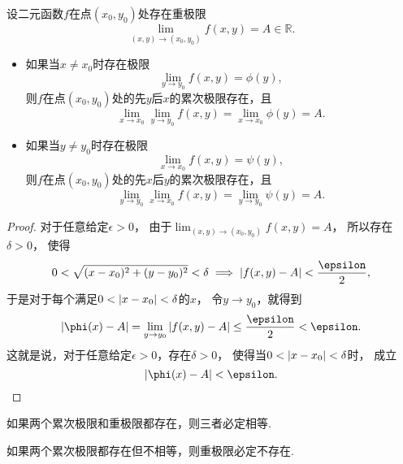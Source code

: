 \begin{theorem}\label{theorem:重极限.二元函数的重极限与累次极限的关系}
设二元函数\(f\)在点\((x_0,y_0)\)处存在重极限\[
	\lim_{(x,y)\to(x_0,y_0)} f(x,y) = A \in \mathbb{R}.
\]\begin{itemize}%
	\item 如果当\(x \neq x_0\)时存在极限\[
		\lim_{y \to y_0} f(x,y) = \phi(y),
	\]
	则\(f\)在点\((x_0,y_0)\)处的先\(y\)后\(x\)的累次极限存在，且\[
		\lim_{x \to x_0} \lim_{y \to y_0} f(x,y)
		= \lim_{x \to x_0} \phi(y) = A.
	\]

	\item 如果当\(y \neq y_0\)时存在极限\[
		\lim_{x \to x_0} f(x,y) = \psi(y),
	\]
	则\(f\)在点\((x_0,y_0)\)处的先\(x\)后\(y\)的累次极限存在，且\[
		\lim_{y \to y_0} \lim_{x \to x_0} f(x,y)
		= \lim_{y \to y_0} \psi(y) = A.
	\]
\end{itemize}
\begin{proof}
对于任意给定\(\epsilon>0\)，
由于\(\lim_{(x,y)\to(x_0,y_0)} f(x,y) = A\)，
所以存在\(\delta>0\)，
使得\[
	0<\sqrt{(x-x_0)^2+(y-y_0)^2}<\delta
	\implies
	\abs{f(x,y)-A}<\frac\epsilon2,
\]
于是对于每个满足\(0<\abs{x-x_0}<\delta\)的\(x\)，
令\(y \to y_0\)，就得到\[
	\abs{\phi(x)-A}
	= \lim_{y \to y_0} \abs{f(x,y)-A}
	\leq \frac\epsilon2
	< \epsilon.
\]
这就是说，对于任意给定\(\epsilon>0\)，存在\(\delta>0\)，
使得当\(0<\abs{x-x_0}<\delta\)时，
成立\[
	\abs{\phi(x)-A} < \epsilon.
	\qedhere
\]
\end{proof}
\end{theorem}

\begin{corollary}
如果两个累次极限和重极限都存在，则三者必定相等.
\end{corollary}

\begin{corollary}
如果两个累次极限都存在但不相等，则重极限必定不存在.
\end{corollary}
